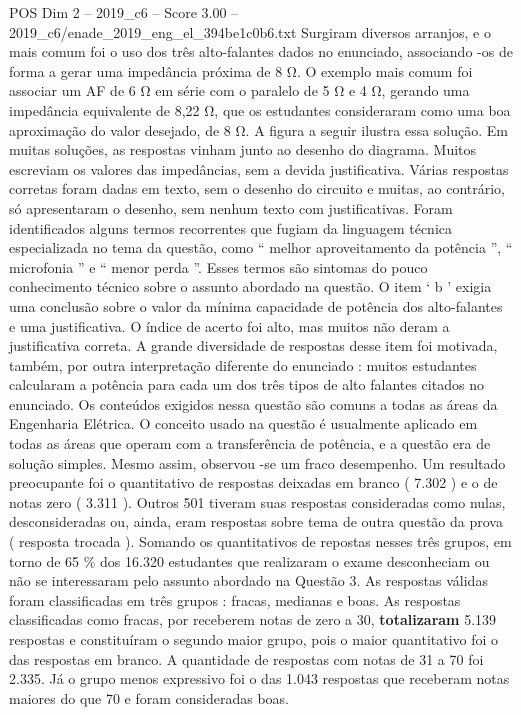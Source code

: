 \begin{textsample}{POS Dim 2 – 2019\_c6 – Score 3.00 – 2019\_c6/enade\_2019\_eng\_el\_394be1c0b6.txt}
Surgiram diversos arranjos, e o mais comum foi o uso dos três alto-falantes dados no enunciado, associando -os de forma a gerar uma impedância próxima de 8 Ω.
O exemplo mais comum foi associar um AF de 6 Ω em série com o paralelo de 5 Ω e 4 Ω, gerando uma impedância equivalente de 8,22 Ω, que os estudantes consideraram como uma boa aproximação do valor desejado, de 8 Ω.
A figura a seguir ilustra essa solução.
Em muitas soluções, as respostas vinham junto ao desenho do diagrama.
Muitos escreviam os valores das impedâncias, sem a devida justificativa.
Várias respostas corretas foram dadas em texto, sem o desenho do circuito e muitas, ao contrário, só apresentaram o desenho, sem nenhum texto com justificativas.
Foram identificados alguns termos recorrentes que fugiam da linguagem técnica especializada no tema da questão, como “ melhor aproveitamento da potência ”, “ microfonia ” e “ menor perda ”.
Esses termos são sintomas do pouco conhecimento técnico sobre o assunto abordado na questão.
O item ‘ b ’ exigia uma conclusão sobre o valor da mínima capacidade de potência dos alto-falantes e uma justificativa.
O índice de acerto foi alto, mas muitos não deram a justificativa correta.
A grande diversidade de respostas desse item foi motivada, também, por outra interpretação diferente do enunciado : muitos estudantes calcularam a potência para cada um dos três tipos de alto falantes citados no enunciado.
Os conteúdos exigidos nessa questão são comuns a todas as áreas da Engenharia Elétrica.
O conceito usado na questão é usualmente aplicado em todas as áreas que operam com a transferência de potência, e a questão era de solução simples.
Mesmo assim, observou -se um fraco desempenho.
Um resultado preocupante foi o quantitativo de respostas deixadas em branco ( 7.302 ) e o de notas zero ( 3.311 ).
Outros 501 tiveram suas respostas consideradas como nulas, desconsideradas ou, ainda, eram respostas sobre tema de outra questão da prova ( resposta trocada ).
Somando os quantitativos de repostas nesses três grupos, em torno de 65 \% dos 16.320 estudantes que realizaram o exame desconheciam ou não se interessaram pelo assunto abordado na Questão 3.
As respostas válidas foram classificadas em três grupos : fracas, medianas e boas.
As respostas classificadas como fracas, por receberem notas de zero a 30, \textbf{totalizaram} 5.139 respostas e constituíram o segundo maior grupo, pois o maior quantitativo foi o das respostas em branco.
A quantidade de respostas com notas de 31 a 70 foi 2.335.
Já o grupo menos expressivo foi o das 1.043 respostas que receberam notas maiores do que 70 e foram consideradas boas.

\end{textsample}
